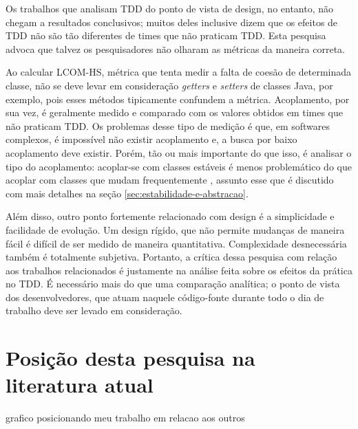 Os trabalhos que analisam TDD do ponto de vista de design, no entanto, não
chegam a resultados conclusivos; muitos deles inclusive dizem que os efeitos
de TDD não são tão diferentes de times que não praticam TDD. Esta pesquisa
advoca que talvez os pesquisadores não olharam as métricas da maneira correta.

Ao calcular LCOM-HS, métrica que tenta medir a falta de coesão de determinada
classe, não se deve levar em consideração \textit{getters} e \textit{setters} de
classes Java, por exemplo, pois esses métodos tipicamente confundem a métrica.
Acoplamento, por sua vez, é geralmente medido e comparado com os valores
obtidos em times que não praticam TDD. Os problemas desse tipo de medição é que,
em softwares complexos, é impossível não existir acoplamento e, a busca por
baixo acoplamento deve existir. Porém, tão ou mais importante do que isso, é
analisar o tipo do acoplamento: acoplar-se com classes estáveis é menos
problemático do que acoplar com classes que mudam frequentemente
\cite{bob-martin}, assunto esse que é discutido com mais detalhes na seção
\ref{sec:estabilidade-e-abstracao}. 

Além disso, outro ponto fortemente relacionado com design é a simplicidade e
facilidade de evolução. Um design rígido, que não permite mudanças de maneira
fácil é difícil de ser medido de maneira quantitativa. Complexidade
desnecessária também é totalmente subjetiva. Portanto, a crítica dessa pesquisa
com relação aos trabalhos relacionados é justamente na análise feita sobre os
efeitos da prática no TDD. É necessário mais do que uma comparação analítica; o
ponto de vista dos desenvolvedores, que atuam naquele código-fonte durante todo
o dia de trabalho deve ser levado em consideração.

\section{Posição desta pesquisa na literatura atual}

grafico posicionando meu trabalho em relacao aos outros

